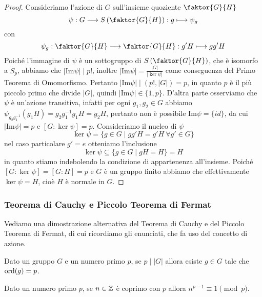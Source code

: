 \documentclass[11pt]{scrartcl}
\begin{document}
\begin{proof}
    Consideriamo l'azione di $G$ sull'insieme quoziente $\faktor{G}{H}$ 
    \[
        \psi: G\longrightarrow S\left(\faktor{G}{H}\right) : g \longmapsto \psi_g
    \]con 
    \[
        \psi_g : \faktor{G}{H}\longrightarrow\faktor{G}{H} : g'H\longmapsto gg'H
    \]Poiché l'immagine di $\psi$ è un sottogruppo di $S\left(\faktor{G}{H}\right)$,
    che è isomorfo a $S_p$, abbiamo che $|\mathrm{Im}\psi| \mid p!$, inoltre 
    $|\mathrm{Im}\psi| = \displaystyle\frac{|G|}{|\ker \psi|}$ come conseguenza
    del Primo Teorema di Omomorfismo. Pertanto $|\mathrm{Im}\psi| \mid (p!, |G|) = p$,
    in quanto $p$ è il più piccolo primo che divide $|G|$, quindi $|\mathrm{Im}\psi| \in \{1, p\}$.
    D'altra parte osserviamo che $\psi$ è un'azione transitiva, infatti per 
    ogni $g_1, g_2 \in G$ abbiamo $\psi_{g_2^{}g_1^{-1}}(g_1H) = g_2g_1^{-1}g_1H = g_2H$,
    pertanto non è possibile $\mathrm{Im}\psi = \{id\}$, da cui $|\mathrm{Im}\psi| = p$
    e $[G:\ker\psi] = p$. Consideriamo il nucleo di $\psi$
    \[
        \ker\psi = \{g\in G\mid gg'H = g'H~\forall g' \in G\}
    \]
    nel caso particolare $g' = e$ otteniamo l'inclusione
    \[
        \ker\psi \subseteq \{g \in G\mid gH = H\} = H
    \]
    in quanto stiamo indebolendo la condizione di appartenenza all'insieme.
    Poiché $[G:\ker \psi] = [G : H] = p$ e $G$ è un gruppo finito abbiamo
    che effettivamente $\ker\psi = H$, cioè $H$ è normale in $G$.
\end{proof}


\subsubsection{Teorema di Cauchy e Piccolo Teorema di Fermat}

Vediamo una dimostrazione alternativa del Teorema di Cauchy e del Piccolo
Teorema di Fermat, di cui ricordiamo gli enunciati, che fa uso del concetto
 di azione. 

\begin{theorem}
    \label{teorema1.44}
    Dato un gruppo $G$ e un numero primo $p$, se $p\mid |G|$ allora esiste 
    $g \in G$ tale che $\operatorname{ord}(g) = p$.
\end{theorem}

\begin{theorem}
    \label{teorema1.45}
    Dato un numero primo $p$, se $n \in \mathbb Z$ è coprimo con $p$ allora 
    $n^{p - 1} \equiv 1 \pmod p$.
\end{theorem}
\end{document}
